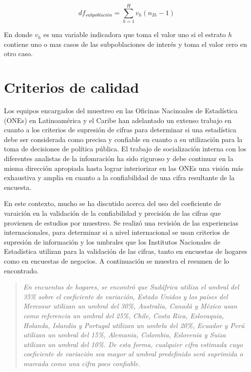 \[
df_{subpoblación} = \sum_{h=1}^H v_h(n_{Ih} - 1)
\]

En donde \(v_h\) es una variable indicadora que toma el valor uno si el estrato \(h\) contiene uno o mas casos de las subpoblaciones de interés y toma el valor cero en otro caso.

\hypertarget{criterios-de-calidad}{%
\chapter{Criterios de calidad}\label{criterios-de-calidad}}

Los equipos encargados del muestreo en las Oficinas Nacinoales de Estadística (ONEs) en Latinoamérica y el Caribe han adelantado un extenso trabajo en cuanto a los criterios de supresión de cifras para determinar si una estadística debe ser considerada como precisa y confiable en cuanto a su utilización para la toma de decisiones de política pública. El trabajo de socialización interna con los diferentes analistas de la infomración ha sido riguroso y debe continuar en la misma dirección apropiada hasta lograr interiorizar en las ONEs una visión más exhaustiva y amplia en cuanto a la confiabilidad de una cifra resultante de la encuesta.

En este contexto, mucho se ha discutido acerca del uso del coeficiente de varaición en la validación de la confiabilidad y precisión de las cifras que provienen de estudios por muestreo. Se realizó una revisión de las experiencias internacionales, para determinar si a nivel internacional se usan criterios de supresión de información y los umbrales que los Institutos Nacionales de Estadística utilizan para la validación de las cifras, tanto en encuestas de hogares como en encuestas de negocios. A continuación se muestra el resumen de lo encontrado.

\begin{quote}
\emph{En encuentas de hogares, se encontró que Sudáfrica utiliza el umbral del 35\% sobre el coeficiente de variación, Estado Unidos y los países del Mercosur utilizan un umbral del 30\%, Australia, Canadá y México usan como referencia un umbral del 25\%, Chile, Costa Rica, Eslovaquia, Holanda, Islandia y Portugal utilizan un umbrla del 20\%, Ecuador y Perú utilizan un umbral del 15\%, Alemania, Colombia, Eslovenia y Suiza utilizan un umbral del 10\%. De esta forma, cualquier cifra estimada cuyo coeficiente de variación sea mayor al umbral predefinido será suprimida o marcada como una cifra poco confiable.}
\end{quote}

